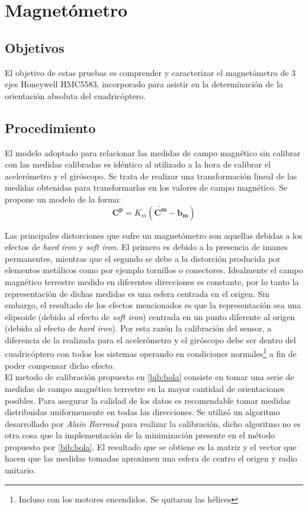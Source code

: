 \documentclass[main]{subfiles}
\begin{document}
\chapter{Magnetómetro}
\label{chap:magnetometro}

\section{Objetivos}

El objetivo de estas pruebas es comprender y caracterizar el magnetómetro de 3 ejes Honeywell HMC5583, incorporado para asistir en la determinación de la orientación absoluta del cuadricóptero.

\section{Procedimiento}
\label{sec:procedimiento}

El modelo adoptado para relacionar las medidas de campo magnético sin calibrar con las medidas calibradas es idéntico al utilizado a la hora de calibrar el acelerómetro y el giróscopo. Se trata de realizar una transformación lineal de las medidas obtenidas para transformarlas en los valores de campo magnético. Se propone un modelo de la forma:
$$
\mathbf{C^p} =K_m (\mathbf{\tilde{C^m}} -  \mathbf{b_m})
$$

Las principales distorciones que sufre un magnet\'ometro son aquellas debidas a los efectos de \emph{hard iron} y \emph{soft iron}. El primero es debido a la presencia de imanes permanentes, mientras que el segundo se debe a la distorci\'on producida por elementos met\'alicos como por ejemplo tornillos o conectores. Idealmente el campo magn\'etico terrestre medido en diferentes direcciones es constante, por lo tanto la representaci\'on de dichas medidas es una esfera centrada en el origen. Sin embargo, el resultado de los efectos mencionados es que la representaci\'on sea una elipsoide (debido al efecto de \emph{soft iron}) centrada en un punto diferente al origen (debido al efecto de \emph{hard iron}). Por esta raz\'on la calibraci\'on del sensor, a diferencia de la realizada para el aceler\'ometro y el gir\'oscopo debe ser dentro del cuadric\'optero con todos los sistemas operando en condiciones normales\footnote{Incluso con los motores encendidos. Se quitaron las h\'elices} a fin de poder compensar dicho efecto.\\


El metodo de calibraci\'on propuesto en \ref{bib:bola} consiste en tomar una serie de medidas de campo magnético terrestre en la mayor cantidad de  orientaciones posibles. Para asegurar la calidad de los datos es recomendable tomar medidas distribuidas uniformemente en todas las direcciones. Se utilizó un algoritmo desarrollado por \emph{Alain Barraud} para realizar la calibración, dicho algoritmo no es otra cosa que la implementación de la minimización presente en el método propuesto por \ref{bib:bola}. El resultado que se obtiene es la matriz y el vector que hacen que las medidas tomadas aproximen una esfera de centro el origen y radio unitario.\\
\end{document}
